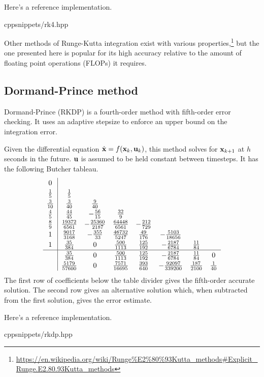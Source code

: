 Here's a reference implementation.
\begin{coderemote}{cpp}{snippets/rk4.hpp}
  \caption{RK4 implementation in C++}
\end{coderemote}

Other methods of Runge-Kutta integration exist with various
properties,\footnote{\url{https://en.wikipedia.org/wiki/Runge\%E2\%80\%93Kutta_methods\#Explicit_Runge.E2.80.93Kutta_methods}}
but the one presented here is popular for its high accuracy relative to the
amount of floating point operations (FLOPs) it requires.

\subsection{Dormand-Prince method}

Dormand-Prince (RKDP) is a fourth-order method with fifth-order error checking.
It uses an adaptive stepsize to enforce an upper bound on the integration error.
\begin{theorem}
  \label{thm:rkdp}

  Given the differential equation $\dot{\mathbf{x}} = f(\mathbf{x}_k, \mathbf{u}_k)$,
  this method solves for $\mathbf{x}_{k+1}$ at $h$ seconds in the future.
  $\mathbf{u}$ is assumed to be held constant between timesteps. It has the
  following Butcher tableau.
  \begin{equation*}
    \renewcommand\arraystretch{1.2}
    \begin{array}{c|ccccccc}
      0 \\
      \frac{1}{5} & \frac{1}{5} \\
      \frac{3}{10} & \frac{3}{40} & \frac{9}{40} \\
      \frac{4}{5} & \frac{44}{45} & -\frac{56}{15} & \frac{32}{9} \\
      \frac{8}{9} & \frac{19372}{6561} & -\frac{25360}{2187} &
        \frac{64448}{6561} & -\frac{212}{729} \\
      1 & \frac{9017}{3168} & -\frac{355}{33} & \frac{46732}{5247} &
        \frac{49}{176} & -\frac{5103}{18656} \\
      1 & \frac{35}{384} & 0 & \frac{500}{1113} & \frac{125}{192} &
        -\frac{2187}{6784} & \frac{11}{84} \\
      \hline
      & \frac{35}{384} & 0 & \frac{500}{1113} & \frac{125}{192} &
        -\frac{2187}{6784} & \frac{11}{84} & 0 \\
      & \frac{5179}{57600} & 0 & \frac{7571}{16695} & \frac{393}{640} &
        -\frac{92097}{339200} & \frac{187}{2100} & \frac{1}{40}
    \end{array}
  \end{equation*}
  The first row of coefficients below the table divider gives the fifth-order
  accurate solution. The second row gives an alternative solution which,
  when subtracted from the first solution, gives the error estimate.
\end{theorem}

Here's a reference implementation.
\begin{coderemote}{cpp}{snippets/rkdp.hpp}
  \caption{RKDP implementation in C++}
\end{coderemote}
